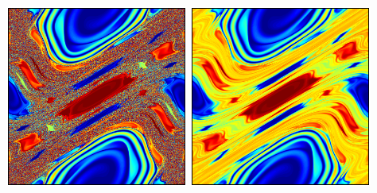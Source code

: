 \documentclass[12pt,t]{beamer}
\begin{document}
\begin{frame}
\begin{center}
\includegraphics[width=0.45\textwidth,trim=1cm 1cm 0cm 0cm]{standardmapsimuexact}
\includegraphics[width=0.45\textwidth,trim=1cm 1cm 0cm 0cm]{standardmapsimumarkov}
\end{center}
\end{frame}
\end{document}
